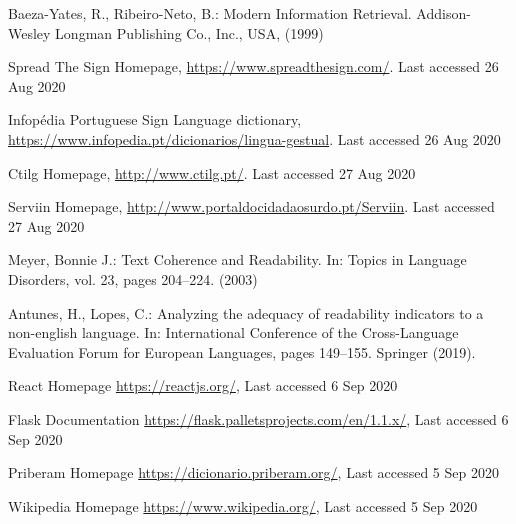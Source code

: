 \documentclass[runningheads]{llncs}
\begin{document}
\begin{thebibliography}{8}
        Baeza-Yates, R., Ribeiro-Neto, B.: Modern Information Retrieval.
        Addison-Wesley Longman Publishing Co., Inc., USA, (1999)

        Spread The Sign Homepage, \url{https://www.spreadthesign.com/}. Last accessed 26 Aug 2020

        Infopédia Portuguese Sign Language dictionary, \url{https://www.infopedia.pt/dicionarios/lingua-gestual}. Last accessed 26 Aug 2020

        Ctilg Homepage, \url{http://www.ctilg.pt/}. Last accessed 27 Aug 2020

        Serviin Homepage, \url{http://www.portaldocidadaosurdo.pt/Serviin}. Last accessed 27 Aug 2020

        Meyer, Bonnie J.: Text Coherence and Readability. In: Topics in Language Disorders, vol. 23, pages 204--224. (2003)

        Antunes, H., Lopes, C.: Analyzing the adequacy of readability indicators to a non-english language.
        In: International Conference of the Cross-Language Evaluation Forum for European Languages,
        pages 149--155. Springer (2019).

        React Homepage \url{https://reactjs.org/}, Last accessed 6 Sep 2020

        Flask Documentation \url{https://flask.palletsprojects.com/en/1.1.x/}, Last accessed 6 Sep 2020

        Priberam Homepage \url{https://dicionario.priberam.org/}, Last accessed 5 Sep 2020

        Wikipedia Homepage \url{https://www.wikipedia.org/}, Last accessed 5 Sep 2020

\end{thebibliography}
\end{document}
